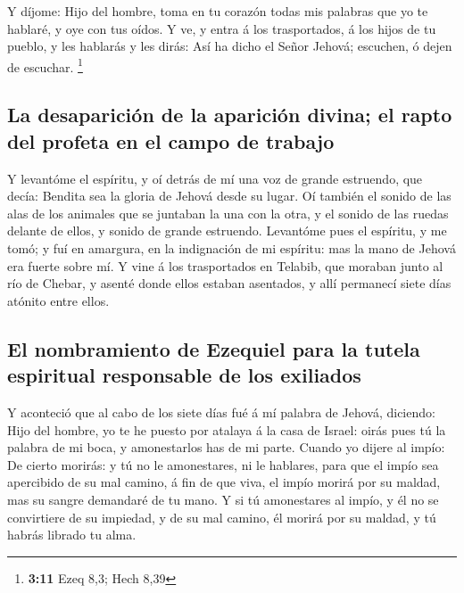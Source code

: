  Y díjome: Hijo del hombre, toma en tu corazón todas mis
palabras que yo te hablaré, y oye con tus oídos.  Y ve, y
entra á los trasportados, á los hijos de tu pueblo, y les hablarás y les
dirás: Así ha dicho el Señor Jehová; escuchen, ó dejen de escuchar.
\footnote{\textbf{3:11} Ezeq 8,3; Hech 8,39}

\hypertarget{la-desapariciuxf3n-de-la-apariciuxf3n-divina-el-rapto-del-profeta-en-el-campo-de-trabajo}{%
\subsection{La desaparición de la aparición divina; el rapto del profeta
en el campo de
trabajo}\label{la-desapariciuxf3n-de-la-apariciuxf3n-divina-el-rapto-del-profeta-en-el-campo-de-trabajo}}

 Y levantóme el espíritu, y oí detrás de mí una voz de
grande estruendo, que decía: Bendita sea la gloria de Jehová desde su
lugar.  Oí también el sonido de las alas de los animales
que se juntaban la una con la otra, y el sonido de las ruedas delante de
ellos, y sonido de grande estruendo.  Levantóme pues el
espíritu, y me tomó; y fuí en amargura, en la indignación de mi
espíritu: mas la mano de Jehová era fuerte sobre mí.  Y
vine á los trasportados en Telabib, que moraban junto al río de Chebar,
y asenté donde ellos estaban asentados, y allí permanecí siete días
atónito entre ellos.

\hypertarget{el-nombramiento-de-ezequiel-para-la-tutela-espiritual-responsable-de-los-exiliados}{%
\subsection{El nombramiento de Ezequiel para la tutela espiritual
responsable de los
exiliados}\label{el-nombramiento-de-ezequiel-para-la-tutela-espiritual-responsable-de-los-exiliados}}

 Y aconteció que al cabo de los siete días fué á mí
palabra de Jehová, diciendo:  Hijo del hombre, yo te he
puesto por atalaya á la casa de Israel: oirás pues tú la palabra de mi
boca, y amonestarlos has de mi parte.  Cuando yo dijere
al impío: De cierto morirás: y tú no le amonestares, ni le hablares,
para que el impío sea apercibido de su mal camino, á fin de que viva, el
impío morirá por su maldad, mas su sangre demandaré de tu mano.
 Y si tú amonestares al impío, y él no se convirtiere de
su impiedad, y de su mal camino, él morirá por su maldad, y tú habrás
librado tu alma.

